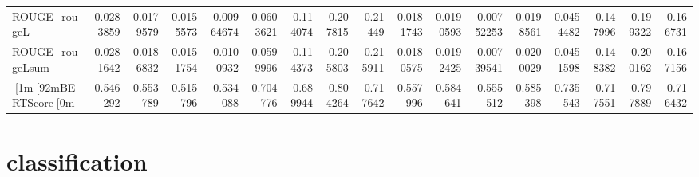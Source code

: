 \begin{tabular}{lrrrrrrrrrrrrrrrr}
 ROUGE_rougeL    & 0.0283859  & 0.0179579  & 0.0155573   & 0.00964674  & 0.0603621 &  0.114074  &  0.207815 &  0.21449  & 0.0181743  & 0.0190593   & 0.00752253  & 0.0198561   & 0.0454482 &  0.147996  &  0.199322 &  0.166731  \\
 ROUGE_rougeLsum & 0.0281642  & 0.0186832  & 0.0151754   & 0.0100932   & 0.0599996 &  0.114373  &  0.205803 &  0.215911 & 0.0180575  & 0.0192425   & 0.00739541  & 0.0200029   & 0.0451598 &  0.148382  &  0.200162 &  0.167156  \\
 [1m[92mBERTScore[0m       & 0.546292   & 0.553789   & 0.515796    & 0.534088    & 0.704776  &  0.689944  &  0.804264 &  0.717642 & 0.557996   & 0.584641    & 0.555512    & 0.585398    & 0.735543  &  0.717551  &  0.797889 &  0.716432  \\
\hline
\end{tabular}\section{classification}
